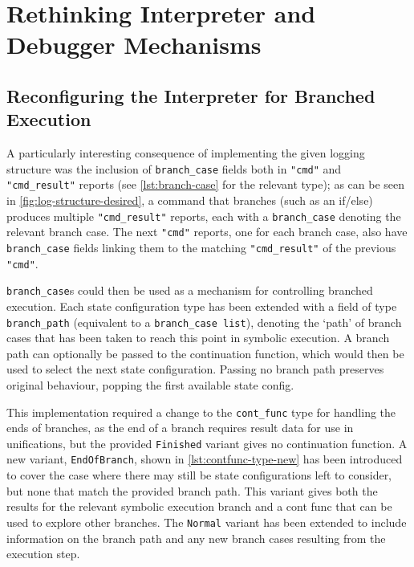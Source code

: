 
\section{Rethinking Interpreter and Debugger Mechanisms}

\subsection{Reconfiguring the Interpreter for Branched Execution}%

A particularly interesting consequence of implementing the given logging
structure was the inclusion of \texttt{branch\_case} fields both in
\texttt{"cmd"} and \texttt{"cmd\_result"} reports (see \autoref{lst:branch-case}
for the relevant type); as can be seen in \autoref{fig:log-structure-desired},
a command that branches (such as an if/else) produces multiple
\texttt{"cmd\_result"} reports, each with a \texttt{branch\_case} denoting the
relevant branch case. The next \texttt{"cmd"} reports, one for each branch case,
also have \texttt{branch\_case} fields linking them to the matching
\texttt{"cmd\_result"} of the previous \texttt{"cmd"}.

\texttt{branch\_case}s could then be used as a mechanism for controlling
branched execution. Each state configuration type has been extended with a field
of type \texttt{branch\_path} (equivalent to a \texttt{branch\_case list}), 
denoting the `path' of branch cases that has been taken to reach this point in
symbolic execution. A branch path can optionally be passed to the continuation
function, which would then be used to select the next state configuration.
Passing no branch path preserves original behaviour, popping the first available
state config.

This implementation required a change to the \texttt{cont\_func} type for
handling the ends of branches, as the end of a branch requires result data for
use in unifications, but the provided \texttt{Finished} variant gives no
continuation function. A new variant, \texttt{EndOfBranch}, shown in
\autoref{lst:contfunc-type-new} has been introduced to cover the case where
there may still be state configurations left to consider, but none that match
the provided branch path. This variant gives both the results for the relevant
symbolic execution branch and a cont func that can be used to explore other
branches. The \texttt{Normal} variant has been extended to include information
on the branch path and any new branch cases resulting from the execution step.

